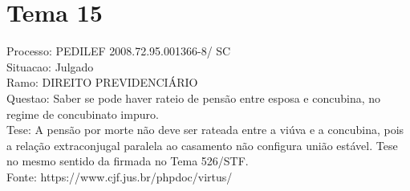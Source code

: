 \documentclass[12pt]{article}
\begin{document}
\section*{Tema 15}
Processo: PEDILEF 2008.72.95.001366-8/ SC\\
Situacao: Julgado\\
Ramo: DIREITO PREVIDENCIÁRIO\\
Questao: Saber se pode haver rateio de pensão entre esposa e concubina, no regime de concubinato impuro.\\
Tese: A pensão por morte não deve ser rateada entre a viúva e a concubina, pois a relação extraconjugal paralela ao casamento não configura união estável. Tese no mesmo sentido da firmada no Tema 526/STF.\\
Fonte: https://www.cjf.jus.br/phpdoc/virtus/
\end{document}
